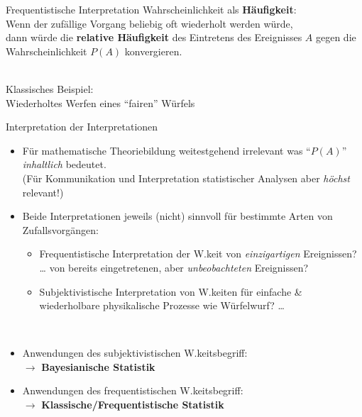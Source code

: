 \documentclass[
  10pt,
  ignorenonframetext,
]{beamer}
\providecommand{\tightlist}{%
  \setlength{\itemsep}{0pt}\setlength{\parskip}{0pt}}
\begin{document}
\begin{frame}{Frequentistische Interpretation}
\protect\hypertarget{frequentistische-interpretation}{}
Wahrscheinlichkeit als \textbf{Häufigkeit}:\\
Wenn der zufällige Vorgang beliebig oft wiederholt werden würde,\\
dann würde die \textbf{relative Häufigkeit} des Eintretens des
Ereignisses \(A\) gegen die Wahrscheinlichkeit \(P(A)\) konvergieren.\\
\strut \\

Klassisches Beispiel:\\
Wiederholtes Werfen eines ``fairen'' Würfels
\end{frame}

\begin{frame}{Interpretation der Interpretationen}
\protect\hypertarget{interpretation-der-interpretationen}{}
\begin{itemize}
\item
  Für mathematische Theoriebildung weitestgehend irrelevant was
  ``\(P(A)\)'' \emph{inhaltlich} bedeutet.\\
  (Für Kommunikation und Interpretation statistischer Analysen aber
  \emph{höchst} relevant!)
\item
  Beide Interpretationen jeweils (nicht) sinnvoll für bestimmte Arten
  von Zufallsvorgängen:

  \begin{itemize}
  \tightlist
  \item
    Frequentistische Interpretation der W.keit von \emph{einzigartigen}
    Ereignissen?\\
    \ldots{} von bereits eingetretenen, aber \emph{unbeobachteten}
    Ereignissen?
  \item
    Subjektivistische Interpretation von W.keiten für einfache \&
    wiederholbare physikalische Prozesse wie Würfelwurf? \ldots{}\\
    \strut \\
  \end{itemize}
\item
  Anwendungen des subjektivistischen W.keitsbegriff:\\
  \(\to\) \textbf{Bayesianische Statistik}
\item
  Anwendungen des frequentistischen W.keitsbegriff:\\
  \(\to\) \textbf{Klassische/Frequentistische Statistik}
\end{itemize}

\end{frame}
\end{document}
